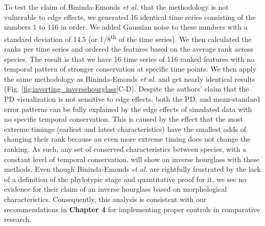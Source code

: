 To test the claim of Bininda-Emonds \textit{et al.} that the methodology is not vulnerable to edge effects, we generated 16 identical time series consisting of the numbers 1 to 116 in order. We added Gaussian noise to these numbers with a standard deviation of 14.5 (or 1/8\textsuperscript{th} of the time series). We then calculated the ranks per time series and ordered the features based on the average rank across species. The result is that we have 16 time series of 116 ranked features with no temporal pattern of stronger conservation at specific time points. We then apply the same methodology as Bininda-Emonds \textit{et al.} and get nearly identical results (Fig. \ref{fig:inverting_inversehourglass}C-D). Despite the authors' claim that the PD visualization is not sensitive to edge effects, both the PD, and mean-standard error patterns can be fully explained by the edge effects of simulated data with no specific temporal conservation. This is caused by the effect that the most extreme timings (earliest and latest characteristics) have the smallest odds of changing their rank because an even more extreme timing does not change the ranking. As such, any set of conserved characteristics between species, with a constant level of temporal conservation, will show an inverse hourglass with these methods. Even though Bininda-Emonds \textit{et al.} are rightfully frustrated by the lack of a definition of the phylotypic stage and quantitative proof for it, we see no evidence for their claim of an inverse hourglass based on morphological characteristics. Consequently, this analysis is consistent with our recommendations in
\textbf{Chapter 4} for implementing proper controls in comparative research.

